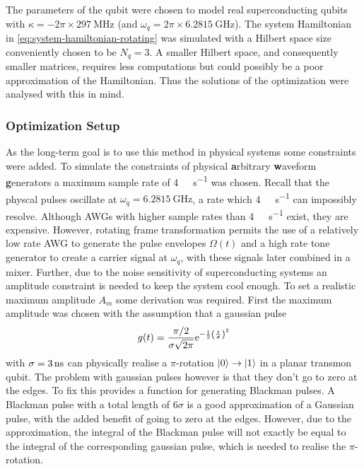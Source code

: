 \documentclass[main.tex]{subfiles}
\begin{document}
The parameters of the qubit were chosen to model real superconducting qubits with \( \kappa = -2\pi\times\SI{297}{\mega\hertz} \) (and \( \omega_{q} = 2\pi\times\SI{6.2815}{\giga\hertz} \)).
The system Hamiltonian in \cref{eq:system-hamiltonian-rotating} was simulated with a Hilbert space size conveniently chosen to be \( N_q = 3 \).
A smaller Hilbert space, and consequently smaller matrices, requires less computations but could possibly be a poor approximation of the Hamiltonian.
Thus the solutions of the optimization were analysed with this in mind.

\subsubsection{Optimization Setup}
As the long-term goal is to use this method in physical systems some constraints were added.
To simulate the constraints of physical \textbf{a}rbitrary \textbf{w}aveform \textbf{g}enerators a maximum sample rate of \SI{4}{\giga\samples\per\second} was chosen.
Recall that the physcal pulses oscillate at \( \omega_{q} = \SI{6.2815}{\giga\hertz} \), a rate which \SI{4}{\giga\samples\per\second} can impossibly resolve.
Although AWGs with higher sample rates than \SI{4}{\giga\samples\per\second} exist, they are expensive.
However, rotating frame transformation permits the use of a relatively low rate AWG to generate the pulse envelopes \( \Omega(t) \) and a high rate tone generator to create a carrier signal at \( \omega_{q} \), with these signals later combined in a mixer.
Further, due to the noise sensitivity of superconducting systems an amplitude constraint is needed to keep the system cool enough.
To set a realistic maximum amplitude \( A_m \) some derivation was required.
First the maximum amplitude was chosen with the assumption that a gaussian pulse
\begin{equation}
    g(t) = \frac{\pi/2}{\sigma\sqrt{2\pi}} \mathrm{e}^{-\frac{1}{2}\qty(\frac{t}{\sigma})^2}
\end{equation}
with \( \sigma = \SI{3}{\nano\second} \) can physically realise a \(\pi\)-rotation \( \ket{0} \rightarrow \ket{1} \) in a planar transmon qubit.
The problem with gaussian pulses however is that they don't go to zero at the edges.
To fix this \krotov{} provides a function for generating Blackman pulses.
A Blackman pulse with a total length of \(6\sigma\) is a good approximation of a Gaussian pulse, with the added benefit of going to zero at the edges.
However, due to the approximation, the integral of the Blackman pulse will not exactly be equal to the integral of the corresponding gaussian pulse, which is needed to realise the \(\pi\)-rotation.
\end{document}
